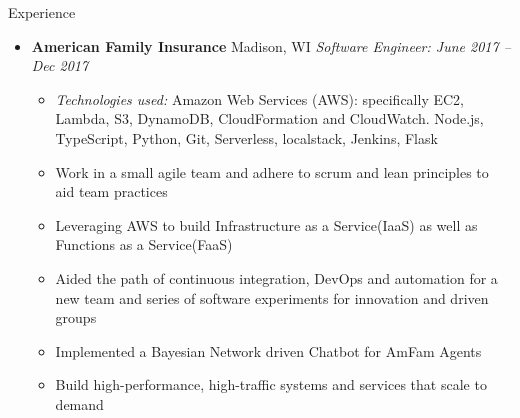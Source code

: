 \documentclass[11pt,oneside]{article}
\newenvironment{ressection}[1]{
    \vspace{4pt}
    {\fontfamily{phv}\selectfont\Large#1}
    \begin{itemize}
    \vspace{3pt}
}{
    \end{itemize}
}
\newcommand{\ressubitem}[1]{
    \vspace{-1pt}
    \item \begin{flushleft} #1 \end{flushleft}
}
\newcommand{\resbigitem}[3]{
    \vspace{-5pt}
    \item
    \textbf{#1} #2 \textit{#3}
}
\newenvironment{ressubsec}[3]{
    \resbigitem{#1}{#2}{#3}
    \vspace{-2pt}
    \begin{itemize}
}{
    \end{itemize}
}
\begin{document}
\begin{ressection}{Experience}

    \begin{ressubsec}{American Family Insurance}{Madison, WI}{Software Engineer: June 2017 -- Dec 2017}
      \ressubitem{\textit{Technologies used:} Amazon Web Services (AWS): specifically EC2, Lambda, S3, DynamoDB, CloudFormation and CloudWatch. Node.js, TypeScript, Python, Git, Serverless, localstack, Jenkins, Flask}
        \ressubitem{Work in a small agile team and adhere to scrum and lean principles to aid team practices}
        \ressubitem{Leveraging AWS to build Infrastructure as a Service(IaaS) as well as Functions as a Service(FaaS)}
        \ressubitem{Aided the path of continuous integration, DevOps and automation for a new team and series of software experiments for innovation and driven groups}
        \ressubitem{Implemented a Bayesian Network driven Chatbot for AmFam Agents}
        \ressubitem{Build high-performance, high-traffic systems and services that scale to demand}
    \end{ressubsec}


\end{ressection}
\end{document}
